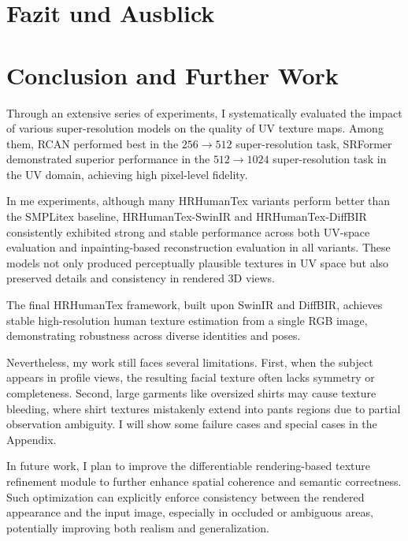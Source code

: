 {\chapter{Fazit und Ausblick}}
{\chapter{Conclusion and Further Work}}

\label{sec:conclusion}

Through an extensive series of experiments, I systematically evaluated the impact of various super-resolution models on the quality of UV texture maps. Among them, RCAN performed best in the $256 \rightarrow 512$ super-resolution task, SRFormer demonstrated superior performance in the $512 \rightarrow 1024$ super-resolution task in the UV domain, achieving high pixel-level fidelity.

 In me experiments, although many HRHumanTex variants perform better than the SMPLitex baseline, HRHumanTex-SwinIR and HRHumanTex-DiffBIR consistently exhibited strong and stable performance across both UV-space evaluation and inpainting-based reconstruction evaluation in all variants. These models not only produced perceptually plausible textures in UV space but also preserved details and consistency in rendered 3D views.

The final HRHumanTex framework, built upon SwinIR and DiffBIR, achieves stable high-resolution human texture estimation from a single RGB image, demonstrating robustness across diverse identities and poses.

Nevertheless, my work still faces several limitations. First, when the subject appears in profile views, the resulting facial texture often lacks symmetry or completeness. Second, large garments like oversized shirts may cause texture bleeding, where shirt textures mistakenly extend into pants regions due to partial observation ambiguity. I will show some failure cases and special cases in the Appendix.

In future work, I plan to improve the differentiable rendering-based texture refinement module to further enhance spatial coherence and semantic correctness. Such optimization can explicitly enforce consistency between the rendered appearance and the input image, especially in occluded or ambiguous areas, potentially improving both realism and generalization.

